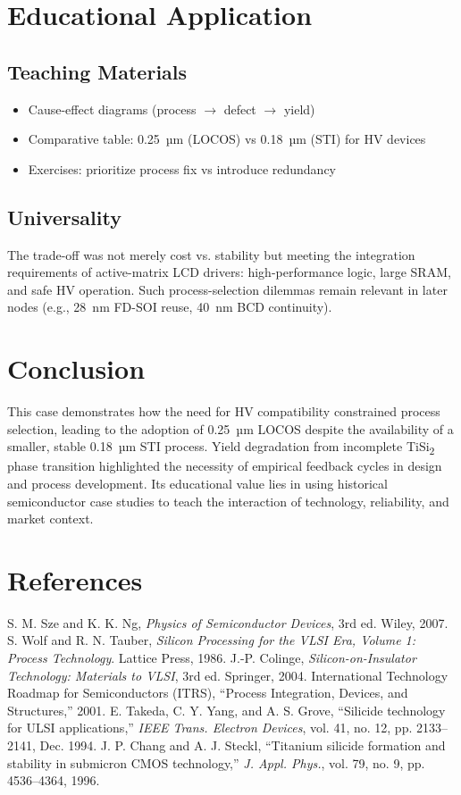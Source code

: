 \documentclass[conference]{IEEEtran}
\begin{document}
\section{Educational Application}
\subsection{Teaching Materials}
\begin{itemize}
    \item Cause-effect diagrams (process $\rightarrow$ defect $\rightarrow$ yield)
    \item Comparative table: 0.25~µm (LOCOS) vs 0.18~µm (STI) for HV devices
    \item Exercises: prioritize process fix vs introduce redundancy
\end{itemize}

\subsection{Universality}
The trade-off was not merely cost vs. stability but meeting the integration requirements of active-matrix LCD drivers: high-performance logic, large SRAM, and safe HV operation.  
Such process-selection dilemmas remain relevant in later nodes (e.g., 28~nm FD-SOI reuse, 40~nm BCD continuity).

\section{Conclusion}
This case demonstrates how the need for HV compatibility constrained process selection, leading to the adoption of 0.25~µm LOCOS despite the availability of a smaller, stable 0.18~µm STI process.  
Yield degradation from incomplete TiSi\textsubscript{2} phase transition highlighted the necessity of empirical feedback cycles in design and process development.  
Its educational value lies in using historical semiconductor case studies to teach the interaction of technology, reliability, and market context.

\section*{References}
\begin{thebibliography}{99}
 S. M. Sze and K. K. Ng, \textit{Physics of Semiconductor Devices}, 3rd ed. Wiley, 2007.
 S. Wolf and R. N. Tauber, \textit{Silicon Processing for the VLSI Era, Volume 1: Process Technology}. Lattice Press, 1986.
 J.-P. Colinge, \textit{Silicon-on-Insulator Technology: Materials to VLSI}, 3rd ed. Springer, 2004.
 International Technology Roadmap for Semiconductors (ITRS), ``Process Integration, Devices, and Structures,'' 2001.
 E. Takeda, C. Y. Yang, and A. S. Grove, ``Silicide technology for ULSI applications,'' \textit{IEEE Trans. Electron Devices}, vol. 41, no. 12, pp. 2133--2141, Dec. 1994.
 J. P. Chang and A. J. Steckl, ``Titanium silicide formation and stability in submicron CMOS technology,'' \textit{J. Appl. Phys.}, vol. 79, no. 9, pp. 4536--4364, 1996.
\end{thebibliography}
\end{document}
